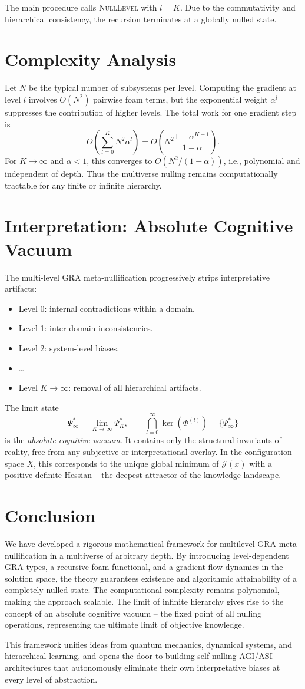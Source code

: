 \documentclass[12pt,a4paper]{article}
\newcommand{\JJ}{\mathcal{J}}
\begin{document}
The main procedure calls \textsc{NullLevel} with $l=K$. Due to the commutativity and hierarchical consistency, the recursion terminates at a globally nulled state.

\section{Complexity Analysis}
Let $N$ be the typical number of subsystems per level. Computing the gradient at level $l$ involves $O(N^2)$ pairwise foam terms, but the exponential weight $\alpha^l$ suppresses the contribution of higher levels. The total work for one gradient step is
\[
O\!\left(\sum_{l=0}^{K} N^2 \alpha^l\right) = O\!\left(N^2 \frac{1-\alpha^{K+1}}{1-\alpha}\right).
\]
For $K\to\infty$ and $\alpha<1$, this converges to $O(N^2/(1-\alpha))$, i.e., polynomial and independent of depth. Thus the multiverse nulling remains computationally tractable for any finite or infinite hierarchy.

\section{Interpretation: Absolute Cognitive Vacuum}
The multi-level GRA meta-nullification progressively strips interpretative artifacts:
\begin{itemize}
\item Level 0: internal contradictions within a domain.
\item Level 1: inter-domain inconsistencies.
\item Level 2: system-level biases.
\item \dots
\item Level $K\to\infty$: removal of all hierarchical artifacts.
\end{itemize}
The limit state
\begin{equation}
\boxed{\Psi^*_\infty = \lim_{K\to\infty} \Psi^*_K,\qquad \bigcap_{l=0}^\infty \ker(\Phi^{(l)}) = \{\Psi^*_\infty\}}
\end{equation}
is the \emph{absolute cognitive vacuum}. It contains only the structural invariants of reality, free from any subjective or interpretational overlay. In the configuration space $X$, this corresponds to the unique global minimum of $\JJ(x)$ with a positive definite Hessian – the deepest attractor of the knowledge landscape.

\section{Conclusion}
We have developed a rigorous mathematical framework for multilevel GRA meta-nullification in a multiverse of arbitrary depth. By introducing level-dependent GRA types, a recursive foam functional, and a gradient-flow dynamics in the solution space, the theory guarantees existence and algorithmic attainability of a completely nulled state. The computational complexity remains polynomial, making the approach scalable. The limit of infinite hierarchy gives rise to the concept of an absolute cognitive vacuum – the fixed point of all nulling operations, representing the ultimate limit of objective knowledge.

This framework unifies ideas from quantum mechanics, dynamical systems, and hierarchical learning, and opens the door to building self-nulling AGI/ASI architectures that autonomously eliminate their own interpretative biases at every level of abstraction.
\end{document}
